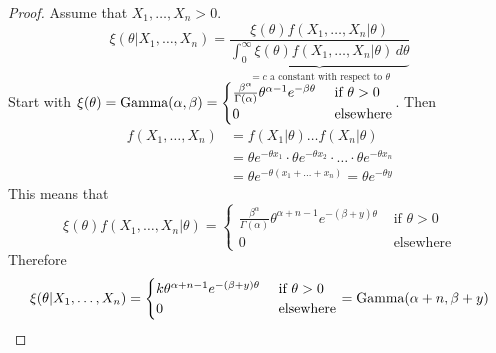 \documentclass[12pt]{article}
\begin{document}
\begin{proof} Assume that $X_1,\dots, X_n > 0$. $$ \xi(\theta | X_1,\dots,X_n) = \frac{\xi(\theta) f(X_1,\dots,X_n | \theta)}{\underbrace{\int_0^\infty \xi(\theta) f(X_1,\dots,X_n | \theta) \, d\theta}_{= c \text{ a constant with respect to } \theta}} $$ 
Start with $\xi(\theta) = \text{Gamma}( \alpha,\beta ) = \begin{cases} \frac{\beta^\alpha}{\Gamma(\alpha)} \theta^{\alpha - 1} e^{-\beta\theta} &\text{ if } \theta > 0 \\ 0 &\text{ elsewhere} \end{cases} $. Then $$ \begin{aligned}
f(X_1,\dots,X_n) &= f(X_1|\theta)\dots f(X_n|\theta) \\ &= \theta e^{-\theta x_1} \cdot \theta e^{-\theta x_2} \cdot \dots \cdot \theta e^{-\theta x_n} \\ &= \theta e^{-\theta(x_1 + \dots + x_n)} = \theta e^{-\theta y} \end{aligned} $$ 
This means that $$ \xi(\theta)f(X_1,\dots,X_n | \theta) = \begin{cases} \frac{\beta^\alpha}{\Gamma(\alpha)} \theta^{\alpha + n - 1} e^{-(\beta + y)\theta} &\text{ if } \theta > 0 \\ 0 &\text{ elsewhere} \end{cases} $$ 
Therefore $$ \xi(\theta | X_1,\dots,X_n) = \begin{cases} k\theta^{\alpha + n - 1} e^{-(\beta + y)\theta} &\text{ if } \theta > 0 \\ 0 &\text{ elsewhere} \end{cases} = \text{Gamma}( \alpha + n, \beta + y ) $$  \end{proof}
\end{document}
